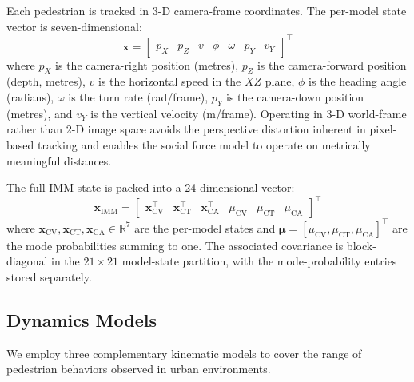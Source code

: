 \documentclass[conference]{IEEEtran}
\begin{document}
Each pedestrian is tracked in 3-D camera-frame coordinates. The per-model state vector is seven-dimensional:
\begin{equation}
\label{eq:state}
\mathbf{x} = \begin{bmatrix} p_X & p_Z & v & \phi & \omega & p_Y & v_Y \end{bmatrix}^\top
\end{equation}
where $p_X$ is the camera-right position (metres), $p_Z$ is the camera-forward position (depth, metres), $v$ is the horizontal speed in the $XZ$ plane, $\phi$ is the heading angle (radians), $\omega$ is the turn rate (rad/frame), $p_Y$ is the camera-down position (metres), and $v_Y$ is the vertical velocity (m/frame). Operating in 3-D world-frame rather than 2-D image space avoids the perspective distortion inherent in pixel-based tracking and enables the social force model to operate on metrically meaningful distances.

The full IMM state is packed into a 24-dimensional vector:
\begin{equation}
\label{eq:packed}
\mathbf{x}_{\text{IMM}} = \begin{bmatrix} \mathbf{x}_{\text{CV}}^\top & \mathbf{x}_{\text{CT}}^\top & \mathbf{x}_{\text{CA}}^\top & \mu_{\text{CV}} & \mu_{\text{CT}} & \mu_{\text{CA}} \end{bmatrix}^\top
\end{equation}
where $\mathbf{x}_{\text{CV}}, \mathbf{x}_{\text{CT}}, \mathbf{x}_{\text{CA}} \in \mathbb{R}^7$ are the per-model states and $\bm{\mu} = [\mu_{\text{CV}}, \mu_{\text{CT}}, \mu_{\text{CA}}]^\top$ are the mode probabilities summing to one. The associated covariance is block-diagonal in the $21{\times}21$ model-state partition, with the mode-probability entries stored separately.

\subsection{Dynamics Models}
\label{sec:dynamics}

We employ three complementary kinematic models to cover the range of pedestrian behaviors observed in urban environments.
\end{document}
